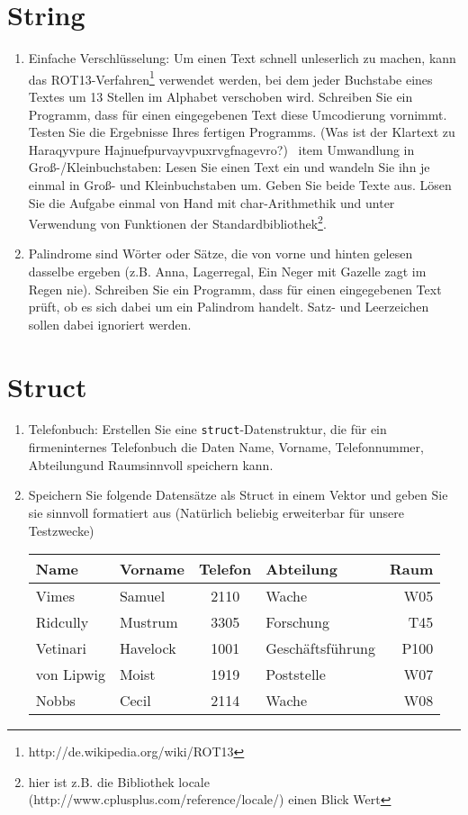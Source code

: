 \documentclass[paper=a4, fontsize=11pt, twoside]{scrartcl}
\begin{document}
\section*{String}
\begin{enumerate}[resume]
  \item Einfache Verschlüsselung: Um einen Text schnell unleserlich zu machen, kann das ROT13-Verfahren\footnote{http://de.wikipedia.org/wiki/ROT13} verwendet werden, bei dem jeder Buchstabe eines Textes um 13 Stellen im Alphabet verschoben wird. Schreiben Sie ein Programm, dass für einen eingegebenen Text diese Umcodierung vornimmt. Testen Sie die Ergebnisse Ihres fertigen Programms. (Was ist der Klartext zu \glqq Haraqyvpure Hajnuefpurvayvpuxrvgfnagevro\grqq?) 
  \ item Umwandlung in Groß-/Kleinbuchstaben: Lesen Sie einen Text ein und wandeln Sie ihn je einmal in Groß- und Kleinbuchstaben um. Geben Sie beide Texte aus. Lösen Sie die Aufgabe einmal von Hand mit char-Arithmethik und unter Verwendung von Funktionen der Standardbibliothek\footnote{hier ist z.B. die Bibliothek \glqq locale\grqq\, (http://www.cplusplus.com/reference/locale/) einen Blick Wert}.
  \item Palindrome sind Wörter oder Sätze, die von vorne und hinten gelesen dasselbe ergeben (z.B. Anna, Lagerregal, Ein Neger mit Gazelle zagt im Regen nie). Schreiben Sie ein Programm, dass für einen eingegebenen Text prüft, ob es sich dabei um ein Palindrom handelt. Satz- und Leerzeichen sollen dabei ignoriert werden.
\end{enumerate}

\section*{Struct}
\begin{enumerate}[resume]
   \item Telefonbuch: Erstellen Sie eine \texttt{struct}-Datenstruktur, die für ein firmeninternes Telefonbuch die Daten \glqq Name\grqq, \glqq Vorname\grqq, \glqq Telefonnummer\grqq, \glqq Abteilung\grqq und \glqq Raum\grqq sinnvoll speichern kann.
   \item Speichern Sie folgende Datensätze als Struct in einem Vektor und geben Sie sie sinnvoll formatiert aus (Natürlich beliebig erweiterbar für unsere Testzwecke)
   \begin{tabular}{llclr}
   Name & Vorname & Telefon & Abteilung & Raum \\    \hline 
   Vimes & Samuel & 2110 & Wache & W05 \\
   Ridcully & Mustrum  & 3305 & Forschung & T45 \\
   Vetinari & Havelock & 1001 & Geschäftsführung & P100 \\
   von Lipwig & Moist  & 1919 & Poststelle & W07 \\
   Nobbs & Cecil & 2114 & Wache & W08
   \end{tabular}
   
\end{enumerate}
\end{document}
